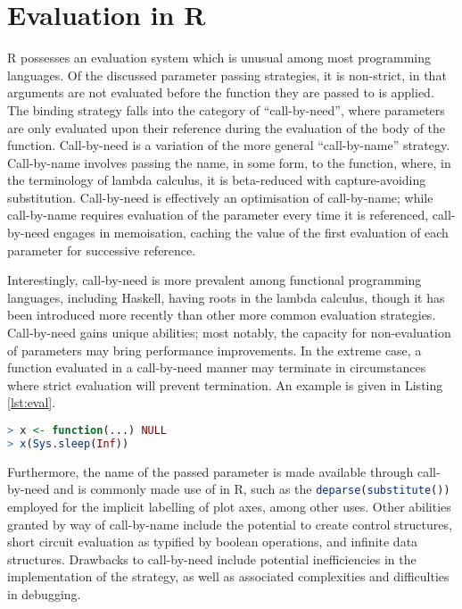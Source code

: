 \documentclass[10pt,a4paper]{article}
\begin{document}
\section{Evaluation in R}\label{sec:evalinr}

R possesses an evaluation system which is unusual among most programming languages.
Of the discussed parameter passing strategies, it is non-strict, in that arguments are not evaluated before the function they are passed to is applied\cite{rcore2020ints:argeval}.
The binding strategy falls into the category of ``call-by-need'', where parameters are only evaluated upon their reference during the evaluation of the body of the function\cite{ariola1995callbyneed}.
Call-by-need is a variation of the more general ``call-by-name'' strategy.
Call-by-name involves passing the name, in some form, to the function, where, in the terminology of lambda calculus, it is beta-reduced with capture-avoiding substitution\cite{fischer1972lambda}.
Call-by-need is effectively an optimisation of call-by-name; while call-by-name requires evaluation of the parameter every time it is referenced, call-by-need engages in memoisation, caching the value of the first evaluation of each parameter for successive reference.

Interestingly, call-by-need is more prevalent among functional programming languages, including Haskell, having roots in the lambda calculus, though it has been introduced more recently than other more common evaluation strategies\cite{nita2017haskell}.
Call-by-need gains unique abilities; most notably, the capacity for non-evaluation of parameters may bring performance improvements.
In the extreme case, a function evaluated in a call-by-need manner may terminate in circumstances where strict evaluation will prevent termination.
An example is given in Listing \ref{lst:eval}.

\begin{lstlisting}[language=R,float,caption={Evaluation of this program will terminate under call-by-need but not terminate under strict evaluation},label=lst:eval]
> x <- function(...) NULL
> x(Sys.sleep(Inf))
\end{lstlisting}

Furthermore, the name of the passed parameter is made available through call-by-need and is commonly made use of in R, such as the \lstinline[language=R]{deparse(substitute())} employed for the implicit labelling of plot axes, among other uses.
Other abilities granted by way of call-by-name include the potential to create control structures, short circuit evaluation as typified by boolean operations, and infinite data structures.
Drawbacks to call-by-need include potential inefficiencies in the implementation of the strategy, as well as associated complexities and difficulties in debugging\cite{nilsson1999lazydebug}.
\end{document}
